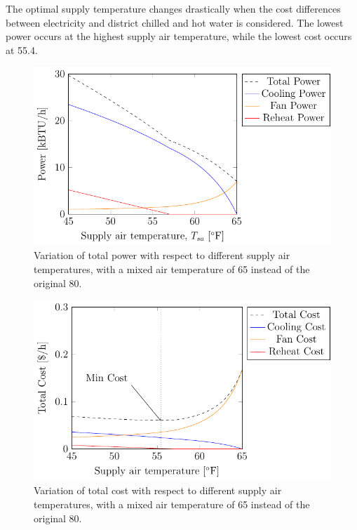The optimal supply temperature changes drastically when the cost
differences between electricity and district chilled and hot water is
considered. The lowest power occurs at the highest supply air
temperature, while the lowest cost occurs at \SI{55.4}{\degreeF}. 

\newcommand{\variationCaptionLowMAT}[1]{Variation of total #1 with respect to different supply air
temperatures, with a mixed air temperature of \SI{65}{\degreeF} instead
of the original \SI{80}{\degreeF}.}

\begin{figure}
\centering
\includegraphics{Plots/34-SimplifiedExampleLowerMAT/simplifiedExampleLowerMAT.pdf}
\caption{\variationCaptionLowMAT{power}}
\label{fig:simplifiedExamplePowerLowerMAT}
\end{figure}

\begin{figure}
\centering
\includegraphics{Plots/36-SimplifiedExampleCostLowerMAT/simplifiedExampleCostHighMAT.pdf}
\caption{\variationCaptionLowMAT{cost}}
\label{fig:simplifiedExampleCostLowerMAT}
\end{figure}



